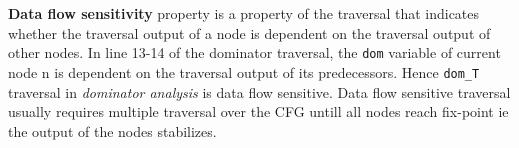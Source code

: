 \begin{definition}
\textbf{Data flow sensitivity} property is a property of the traversal that indicates whether the traversal output of a node is dependent on the traversal output of other nodes. In line 13-14 of the dominator traversal, the \texttt{dom}
variable of current node n is dependent on the traversal output
of its predecessors. Hence \texttt{dom\_T} traversal in \textit{dominator analysis}
is data flow sensitive. Data flow sensitive traversal usually requires multiple traversal over the CFG untill all nodes reach fix-point ie the output of the nodes stabilizes.
\end{definition} 

